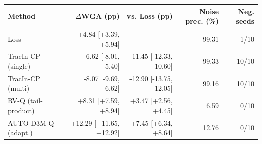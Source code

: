\begin{tabular}{lrrrr}
\toprule
Method & $\Delta$WGA (pp) & vs. Loss (pp) & Noise prec. (\%) & Neg. seeds \\
\midrule
Loss & +4.84 [+3.39, +5.94] & -- & 99.31 & 1/10 \\
TracIn-CP (single) & -6.62 [-8.01, -5.40] & -11.45 [-12.33, -10.60] & 99.33 & 10/10 \\
TracIn-CP (multi) & -8.07 [-9.69, -6.62] & -12.90 [-13.75, -12.05] & 99.16 & 10/10 \\
RV-Q (tail-product) & +8.31 [+7.59, +8.94] & +3.47 [+2.56, +4.45] & 6.59 & 0/10 \\
AUTO-D3M-Q (adapt.) & +12.29 [+11.65, +12.92] & +7.45 [+6.34, +8.64] & 12.76 & 0/10 \\
\bottomrule
\end{tabular}
